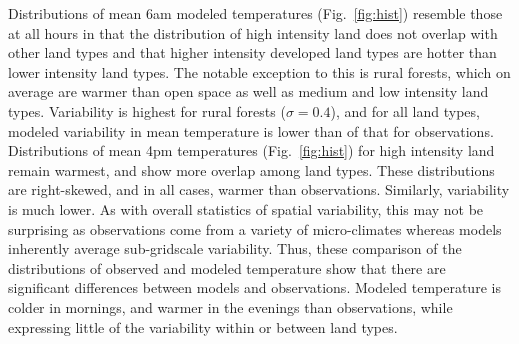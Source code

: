 \documentclass[draft,linenumbers]{agujournal}
\begin{document}
Distributions of mean 6am modeled temperatures (Fig.~\ref{fig:hist}) resemble those at all hours in that the distribution of high intensity land does not overlap with other land types and that higher intensity developed land types are hotter than lower intensity land types. The notable exception to this is rural forests, which on average are warmer than open space as well as medium and low intensity land types. Variability is highest for rural forests ($\sigma = 0.4$), and for all land types, modeled variability in mean temperature is lower than of that for observations. Distributions of mean 4pm temperatures (Fig.~\ref{fig:hist}) for high intensity land remain warmest, and show more overlap among land types. These distributions are right-skewed, and in all cases, warmer than observations. Similarly, variability is much lower. As with overall statistics of spatial variability, this may not be surprising as observations come from a variety of micro-climates whereas models inherently average sub-gridscale variability. Thus, these comparison of the distributions of observed and modeled temperature show that there are significant differences between models and observations. Modeled temperature is colder in mornings, and warmer in the evenings than observations, while expressing little of the variability within or between land types. 
\end{document}
